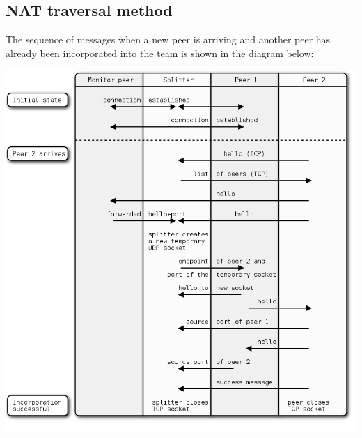 \documentclass{article}
\begin{document}
\subsection{NAT traversal method}

The sequence of messages when a new peer is arriving and another peer
has already been incorporated into the team is shown in the diagram
below:

\begin{center}
\includegraphics{images/NAT_traversal.png}
\end{center}
\end{document}
